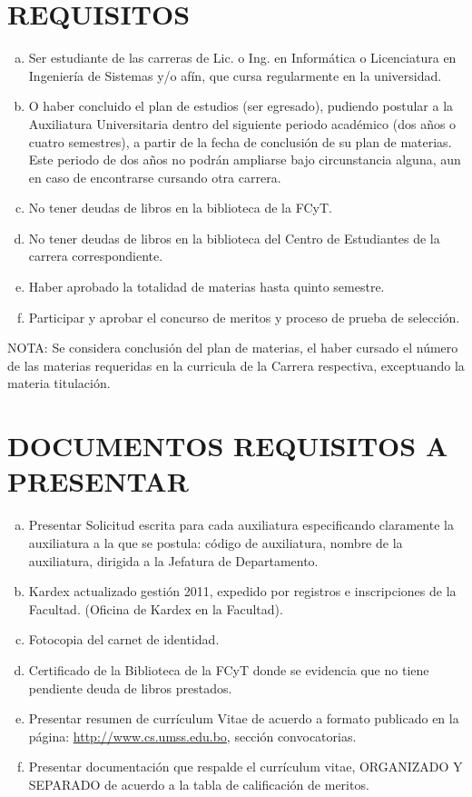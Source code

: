 \documentclass[letterpaper,11pt]{article}
\begin{document}
\section{REQUISITOS}
\begin{enumerate}[a)]
\item Ser estudiante de las carreras de Lic. o Ing. en Informática o Licenciatura en Ingeniería de Sistemas y/o afín, que cursa regularmente en la universidad.
\item O haber concluido el plan de estudios (ser egresado), pudiendo postular a la Auxiliatura Universitaria dentro del siguiente periodo académico (dos años o cuatro semestres), a partir de la fecha de conclusión de su plan de materias. Este periodo de dos años no podrán ampliarse bajo circunstancia alguna, aun en caso de encontrarse cursando otra carrera.
\item No tener deudas de libros en la biblioteca de la FCyT.
\item No tener deudas de libros en la biblioteca del Centro de Estudiantes de la carrera correspondiente.
\item Haber aprobado la totalidad de materias hasta quinto semestre.
\item Participar y aprobar el concurso de meritos y proceso de prueba de selección.
\end{enumerate}

NOTA: Se considera conclusión del plan de materias, el haber cursado el número de las materias requeridas en la curricula de la Carrera respectiva, exceptuando la materia titulación.

\section{DOCUMENTOS REQUISITOS A PRESENTAR}
\begin{enumerate}[a)]
\item Presentar Solicitud escrita para cada auxiliatura especificando claramente la auxiliatura a la que se postula: código de auxiliatura, nombre de la auxiliatura, dirigida a la Jefatura de Departamento.
\item Kardex actualizado gestión 2011, expedido por registros e inscripciones de la Facultad. (Oficina de Kardex en la Facultad).
\item Fotocopia del carnet de identidad.
\item Certificado de la Biblioteca de la FCyT donde se evidencia que no tiene pendiente deuda de libros prestados.
\item Presentar resumen de currículum Vitae de acuerdo a formato publicado en la página: \url{http://www.cs.umss.edu.bo}, sección convocatorias.
\item Presentar documentación que respalde el currículum vitae, ORGANIZADO Y SEPARADO de acuerdo a la tabla de calificación de meritos.
\end{enumerate}
\end{document}
